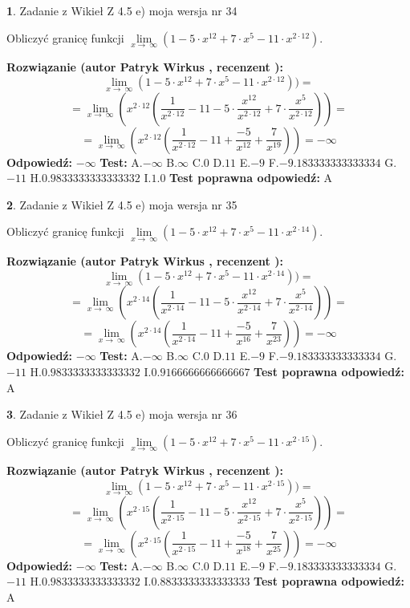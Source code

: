\documentclass[12pt, a4paper]{article}
\theoremstyle{definition} %
\newtheorem{zad}{}
\newcommand{\zadStart}[1]{\begin{zad}#1\newline}
\newcommand{\zadStop}{\end{zad}}
\newcommand{\rozwStart}[2]{\noindent \textbf{Rozwiązanie (autor #1 , recenzent #2): }\newline}
\newcommand{\rozwStop}{\newline}
\newcommand{\odpStart}{\noindent \textbf{Odpowiedź:}\newline}
\newcommand{\odpStop}{\newline}
\newcommand{\testStart}{\noindent \textbf{Test:}\newline}
\newcommand{\testStop}{\newline}
\newcommand{\kluczStart}{\noindent \textbf{Test poprawna odpowiedź:}\newline}
\newcommand{\kluczStop}{\newline}
\begin{document}
\zadStart{Zadanie z Wikieł Z 4.5 e) moja wersja nr 34}


Obliczyć granicę funkcji  $\lim\limits_{x\to\ \infty}(1 - 5 \cdot x^{12}+7 \cdot x^{5}- 11 \cdot x^{2\cdot12})$.
\zadStop
\rozwStart{Patryk Wirkus}{}
$$\lim\limits_{x\to\ \infty}(1 - 5 \cdot x^{12}+7 \cdot x^{5}- 11 \cdot x^{2\cdot12}))=$$
$$=\lim\limits_{x\to\ \infty}(x^{2\cdot12}(\frac{1}{x^{2\cdot12}}-11 -5 \cdot \frac{x^{12}}{x^{2\cdot12}}+7 \cdot \frac{x^{5}}{x^{2\cdot12}}))=$$
$$=\lim\limits_{x\to\ \infty}(x^{2\cdot12}(\frac{1}{x^{2\cdot12}}-11 + \frac{-5}{x^{12}}+ \frac{7}{x^{19}}))=-\infty$$
\rozwStop
\odpStart
$-\infty$
\odpStop
\testStart
A.$-\infty$ B.$\infty$ C.$0$ D.$11$ E.$-9$
F.$-9.183333333333334$ G.$-11$
H.$0.9833333333333332$
I.$1.0$
\testStop
\kluczStart
A
\kluczStop



\zadStart{Zadanie z Wikieł Z 4.5 e) moja wersja nr 35}


Obliczyć granicę funkcji  $\lim\limits_{x\to\ \infty}(1 - 5 \cdot x^{12}+7 \cdot x^{5}- 11 \cdot x^{2\cdot14})$.
\zadStop
\rozwStart{Patryk Wirkus}{}
$$\lim\limits_{x\to\ \infty}(1 - 5 \cdot x^{12}+7 \cdot x^{5}- 11 \cdot x^{2\cdot14}))=$$
$$=\lim\limits_{x\to\ \infty}(x^{2\cdot14}(\frac{1}{x^{2\cdot14}}-11 -5 \cdot \frac{x^{12}}{x^{2\cdot14}}+7 \cdot \frac{x^{5}}{x^{2\cdot14}}))=$$
$$=\lim\limits_{x\to\ \infty}(x^{2\cdot14}(\frac{1}{x^{2\cdot14}}-11 + \frac{-5}{x^{16}}+ \frac{7}{x^{23}}))=-\infty$$
\rozwStop
\odpStart
$-\infty$
\odpStop
\testStart
A.$-\infty$ B.$\infty$ C.$0$ D.$11$ E.$-9$
F.$-9.183333333333334$ G.$-11$
H.$0.9833333333333332$
I.$0.9166666666666667$
\testStop
\kluczStart
A
\kluczStop



\zadStart{Zadanie z Wikieł Z 4.5 e) moja wersja nr 36}


Obliczyć granicę funkcji  $\lim\limits_{x\to\ \infty}(1 - 5 \cdot x^{12}+7 \cdot x^{5}- 11 \cdot x^{2\cdot15})$.
\zadStop
\rozwStart{Patryk Wirkus}{}
$$\lim\limits_{x\to\ \infty}(1 - 5 \cdot x^{12}+7 \cdot x^{5}- 11 \cdot x^{2\cdot15}))=$$
$$=\lim\limits_{x\to\ \infty}(x^{2\cdot15}(\frac{1}{x^{2\cdot15}}-11 -5 \cdot \frac{x^{12}}{x^{2\cdot15}}+7 \cdot \frac{x^{5}}{x^{2\cdot15}}))=$$
$$=\lim\limits_{x\to\ \infty}(x^{2\cdot15}(\frac{1}{x^{2\cdot15}}-11 + \frac{-5}{x^{18}}+ \frac{7}{x^{25}}))=-\infty$$
\rozwStop
\odpStart
$-\infty$
\odpStop
\testStart
A.$-\infty$ B.$\infty$ C.$0$ D.$11$ E.$-9$
F.$-9.183333333333334$ G.$-11$
H.$0.9833333333333332$
I.$0.8833333333333333$
\testStop
\kluczStart
A
\kluczStop
\end{document}
